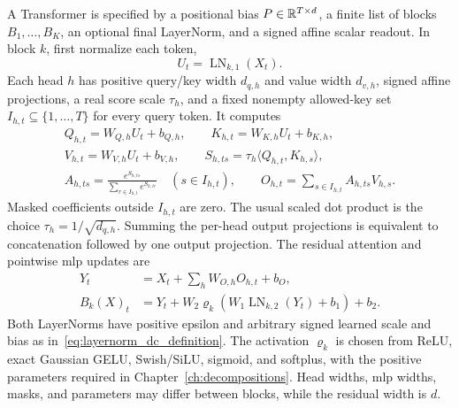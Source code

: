 \begin{definition}\label{def:prenorm_transformer}
A Transformer is specified by a positional bias $P\in\mathbb{R}^{T\times d}$, a finite list of blocks $B_1,\dots,B_K$, an optional final LayerNorm, and a signed affine scalar readout. In block $k$, first normalize each token,
\begin{equation*}
    U_t=\operatorname{LN}_{k,1}(X_t).
\end{equation*}
Each head $h$ has positive query/key width $d_{q,h}$ and value width $d_{v,h}$, signed affine projections, a real score scale $\tau_h$, and a fixed nonempty allowed-key set $I_{h,t}\subseteq\{1,\dots,T\}$ for every query token. It computes
\begin{equation}
\begin{gathered}
    Q_{h,t}=W_{Q,h}U_t+b_{Q,h},\qquad
    K_{h,t}=W_{K,h}U_t+b_{K,h},\\
    V_{h,t}=W_{V,h}U_t+b_{V,h},\qquad
    S_{h,ts}=\tau_h\langle Q_{h,t},K_{h,s}\rangle,\\
    A_{h,ts}=\frac{e^{S_{h,ts}}}{\sum_{r\in I_{h,t}}e^{S_{h,tr}}}
       \quad(s\in I_{h,t}),\qquad
    O_{h,t}=\sum_{s\in I_{h,t}}A_{h,ts}V_{h,s}.
\end{gathered}
    \label{eq:explicit_transformer_attention}
\end{equation}
Masked coefficients outside $I_{h,t}$ are zero. The usual scaled dot product is the choice $\tau_h=1/\sqrt{d_{q,h}}$. Summing the per-head output projections is equivalent to concatenation followed by one output projection. The residual attention and pointwise \ac{mlp} updates are
\begin{equation}
\begin{aligned}
    Y_t&=X_t+\sum_h W_{O,h}O_{h,t}+b_O,\\
    B_k(X)_t&=Y_t+W_2\varrho_k\!\left(W_1\operatorname{LN}_{k,2}(Y_t)+b_1\right)+b_2.
\end{aligned}
    \label{eq:explicit_transformer_block}
\end{equation}
Both LayerNorms have positive epsilon and arbitrary signed learned scale and bias as in~\eqref{eq:layernorm_dc_definition}. The activation $\varrho_k$ is chosen from ReLU, exact Gaussian GELU, Swish/SiLU, sigmoid, and softplus, with the positive parameters required in Chapter~\ref{ch:decompositions}. Head widths, \ac{mlp} widths, masks, and parameters may differ between blocks, while the residual width is $d$.


\end{definition}

